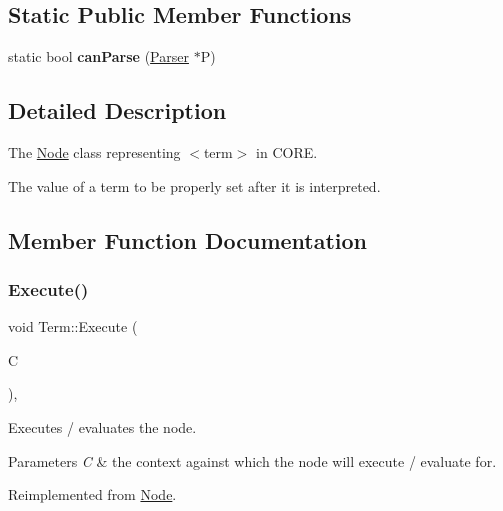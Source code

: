 \subsection*{Static Public Member Functions}
\begin{DoxyCompactItemize}
\item 
\mbox{\label{class_term_a62bd6aba986af937760d22bc27c3eee1}} 
static bool {\bfseries can\+Parse} (\mbox{\hyperlink{class_parser}{Parser}} $\ast$P)
\end{DoxyCompactItemize}


\subsection{Detailed Description}
The \mbox{\hyperlink{class_node}{Node}} class representing {\ttfamily $<$term$>$} in C\+O\+RE. 

The value of a term to be properly set after it is interpreted. 

\subsection{Member Function Documentation}
\mbox{\label{class_term_aca584601256c9ccb79b5936907b7bf30}} 
\subsubsection{\texorpdfstring{Execute()}{Execute()}}
{\footnotesize\ttfamily void Term\+::\+Execute (\begin{DoxyParamCaption}\item[{\mbox{\hyperlink{class_a_s_t_context}{A\+S\+T\+Context}} \&}]{C }\end{DoxyParamCaption})\hspace{0.3cm}{\ttfamily [override]}, {\ttfamily [virtual]}}

Executes / evaluates the node. 
\begin{DoxyParams}{Parameters}
{\em C} & the context against which the node will execute / evaluate for. \\
\hline
\end{DoxyParams}


Reimplemented from \mbox{\hyperlink{class_node_a27ad1ba81d2596817b361368282bcbfa}{Node}}.

\mbox{\label{class_term_a36f292dd7bd0d04cb97ca97afd476fc7}} 
